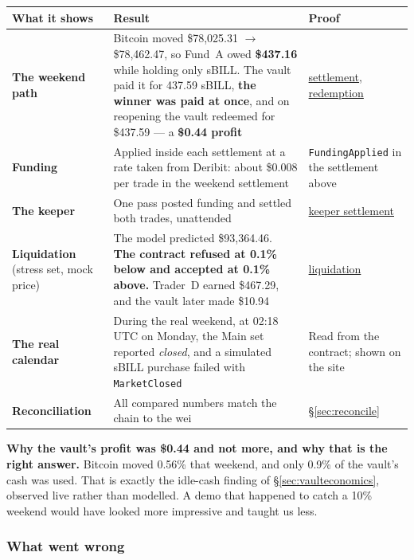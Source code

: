 \documentclass[11pt,a4paper]{article}
\newcommand{\note}[1]{{\small\color{muted}#1}}
\newcommand{\cbox}[1]{%
  \begin{center}\colorbox{panel}{\parbox{0.95\textwidth}{\vspace{3pt}#1\vspace{3pt}}}\end{center}}
\newcommand{\eshort}[2]{\href{https://sepolia.etherscan.io/tx/#1}{#2}}
\begin{document}
\begin{center}
\small
\begin{tabular}{@{}p{3.4cm}p{8.4cm}p{3.2cm}@{}}
\toprule
\textbf{What it shows} & \textbf{Result} & \textbf{Proof} \\
\midrule
\textbf{The weekend path} & Bitcoin moved \$78,025.31 $\to$ \$78,462.47, so Fund~A owed \textbf{\$437.16} while holding only sBILL. The vault paid it for 437.59 sBILL, \textbf{the winner was paid at once}, and on reopening the vault redeemed for \$437.59 --- a \textbf{\$0.44 profit} & \eshort{0x6386b7da7d301f822b1ec2765c585bdf6cf096c73d5575d25d15e22d9153d89c}{settlement}, \eshort{0x73bd20e396b21f742f633ad33bb5f621f5b636439dbd4e22dc82411eda14c813}{redemption} \\
\textbf{Funding} & Applied inside each settlement at a rate taken from Deribit: about \$0.008 per trade in the weekend settlement & \texttt{FundingApplied} in the settlement above \\
\textbf{The keeper} & One pass posted funding and settled both trades, unattended & \eshort{0xab77d5949d13654c01c898635aacaaef394ff454e6cc583a3ffd858b6cf55557}{keeper settlement} \\
\textbf{Liquidation} \note{(stress set, mock price)} & The model predicted \$93,364.46. \textbf{The contract refused at 0.1\% below and accepted at 0.1\% above.} Trader~D earned \$467.29, and the vault later made \$10.94 & \eshort{0x4036f3cc7c2febb3abf3a7e4524d3040effc0cc84fe92f96e1217121b6ee146b}{liquidation} \\
\textbf{The real calendar} & During the real weekend, at 02:18 UTC on Monday, the Main set reported \emph{closed}, and a simulated sBILL purchase failed with \texttt{MarketClosed} & Read from the contract; shown on the site \\
\textbf{Reconciliation} & All \reconCount{} compared numbers match the chain to the wei & \S\ref{sec:reconcile} \\
\bottomrule
\end{tabular}
\end{center}

\cbox{\textbf{Why the vault's profit was \$0.44 and not more, and why that is the right answer.}
Bitcoin moved 0.56\% that weekend, and only 0.9\% of the vault's cash was used. That is exactly the
idle-cash finding of \S\ref{sec:vaulteconomics}, observed live rather than modelled. A demo that
happened to catch a 10\% weekend would have looked more impressive and taught us less.}

\subsubsection*{What went wrong}
\end{document}
